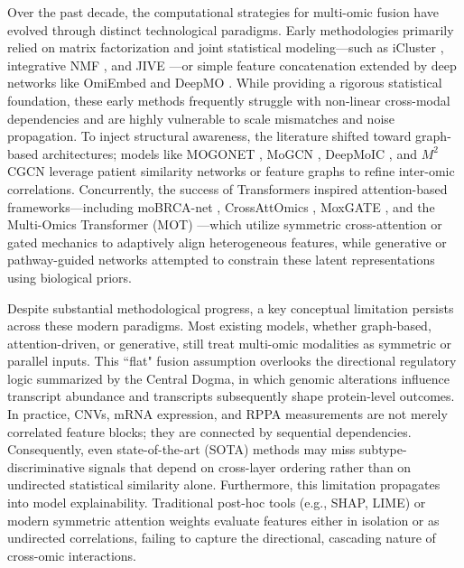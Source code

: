 \documentclass[lettersize,journal]{IEEEtran}
\begin{document}
Over the past decade, the computational strategies for multi-omic fusion have evolved through distinct technological paradigms. Early methodologies primarily relied on matrix factorization and joint statistical modeling—such as iCluster \cite{iCluster2009}, integrative NMF \cite{IntNMF2017}, and JIVE \cite{JIVE2013}—or simple feature concatenation extended by deep networks like OmiEmbed \cite{OmiEmbed2021} and DeepMO \cite{DeepMO2020}. While providing a rigorous statistical foundation, these early methods frequently struggle with non-linear cross-modal dependencies and are highly vulnerable to scale mismatches and noise propagation. To inject structural awareness, the literature shifted toward graph-based architectures; models like MOGONET \cite{MOGONET2021}, MoGCN \cite{MoGCN2022}, DeepMoIC \cite{DeepMoIC2024}, and $M^2$CGCN \cite{M2CGCN2025} leverage patient similarity networks or feature graphs to refine inter-omic correlations. Concurrently, the success of Transformers inspired attention-based frameworks—including moBRCA-net \cite{moBRCAnat2023}, CrossAttOmics \cite{CrossAttOmics2024}, MoxGATE \cite{MoxGATE2023}, and the Multi-Omics Transformer (MOT) \cite{MOT2023}—which utilize symmetric cross-attention or gated mechanics to adaptively align heterogeneous features, while generative or pathway-guided networks \cite{SubtypeGAN2020, SurvPath2023} attempted to constrain these latent representations using biological priors.

Despite substantial methodological progress, a key conceptual limitation persists across these modern paradigms. Most existing models, whether graph-based, attention-driven, or generative, still treat multi-omic modalities as symmetric or parallel inputs. This ``flat" fusion assumption overlooks the directional regulatory logic summarized by the Central Dogma, in which genomic alterations influence transcript abundance and transcripts subsequently shape protein-level outcomes. In practice, CNVs, mRNA expression, and RPPA measurements are not merely correlated feature blocks; they are connected by sequential dependencies. Consequently, even state-of-the-art (SOTA) methods may miss subtype-discriminative signals that depend on cross-layer ordering rather than on undirected statistical similarity alone. Furthermore, this limitation propagates into model explainability. Traditional post-hoc tools (e.g., SHAP, LIME) or modern symmetric attention weights \cite{moBRCAnat2023, OmiEmbed2021} evaluate features either in isolation or as undirected correlations, failing to capture the directional, cascading nature of cross-omic interactions.
\end{document}
